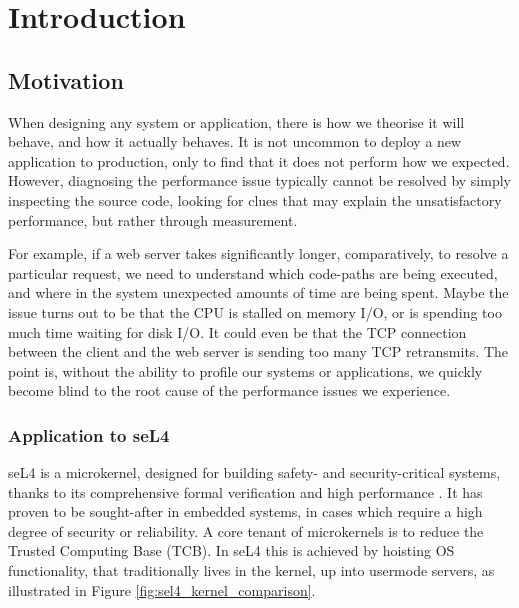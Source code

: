 \chapter{Introduction}\label{ch:intro}

\section{Motivation}

When designing any system or application, there is how we theorise it will behave, and how it actually behaves. It is not uncommon to deploy a new application to production, only to find that it does not perform how we expected. However, diagnosing the performance issue typically cannot be resolved by simply inspecting the source code, looking for clues that may explain the unsatisfactory performance, but rather through measurement.

For example, if a web server takes significantly longer, comparatively, to resolve a particular request, we need to understand which code-paths are being executed, and where in the system unexpected amounts of time are being spent. Maybe the issue turns out to be that the CPU is stalled on memory I/O, or is spending too much time waiting for disk I/O. It could even be that the TCP connection between the client and the web server is sending too many TCP retransmits. The point is, without the ability to profile our systems or applications, we quickly become blind to the root cause of the performance issues we experience.

\subsection{Application to seL4}

seL4 is a microkernel, designed for building safety- and security-critical systems, thanks to its comprehensive formal verification and high performance \cite{SiteAboutSeL4}. It has proven to be sought-after in embedded systems, in cases which require a high degree of security or reliability. A core tenant of microkernels is to reduce the Trusted Computing Base (TCB). In seL4 this is achieved by hoisting OS functionality, that traditionally lives in the kernel, up into usermode servers, as illustrated in Figure \ref{fig:sel4_kernel_comparison}.

